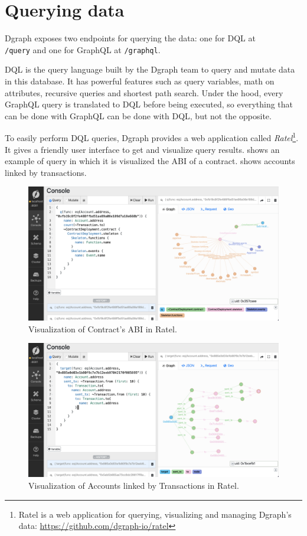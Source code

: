  \section{Querying data}

Dgraph exposes two endpoints for querying the data: one for DQL at \\{\tt /query} and one for GraphQL at {\tt /graphql}.

DQL is the query language built by the Dgraph team to query and mutate data in this database. It has powerful features such as query variables, math on attributes, recursive queries and shortest path search. Under the hood, every GraphQL query is translated to DQL before being executed, so everything that can be done with GraphQL can be done with DQL, but not the opposite.

To easily perform DQL queries, Dgraph provides a web application called \textit{Ratel}\footnote{Ratel is a web application for querying, visualizing and managing Dgraph's data: \url{https://github.com/dgraph-io/ratel}}. It gives a friendly user interface to get and visualize query results.  shows an example of query in which it is visualized the ABI of a contract.  shows accounts linked by transactions.

\begin{figure}[H]
    \centering
    \includegraphics[width=1\textwidth]{Figures/results/ratel-1.png}
    \caption{Visualization of Contract's ABI in Ratel.}
    \label{fig:ratel-1}
\end{figure}

\begin{figure}[H]
    \centering
    \includegraphics[width=1\textwidth]{Figures/results/ratel-2.png}
    \caption{Visualization of Accounts linked by Transactions in Ratel.}
    \label{fig:ratel-2}
\end{figure}

